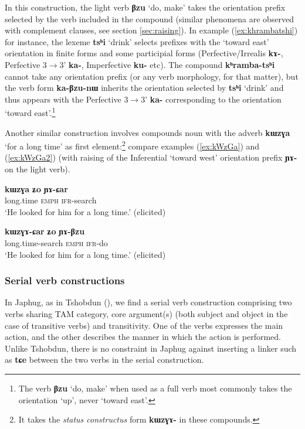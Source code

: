 \documentclass[oneside,a4paper,11pt]{article}
\newcommand{\ipa}[1]{\textbf{\phon#1}} %
\newcommand{\jpg}[2]{\ipa{#1} `#2'} %
\newcommand{\refb}[1]{(\ref{#1})}
\begin{document}
In this construction, the light verb \jpg{βzu}{do, make} takes the orientation prefix selected by the verb included in the compound (similar phenomena are observed with complement clauses, see section \ref{sec:raising}). In example \refb{ex:khrambatshi} for instance, the lexeme \jpg{tsʰi}{drink} selects prefixes with the `toward east' orientation in finite forms and some participial forms (Perfective/Irrealis \ipa{kɤ-}, Perfective 3$\rightarrow$3' \ipa{ka-}, Imperfective \ipa{ku-} etc). The compound  \ipa{kʰramba-tsʰi} cannot take any orientation prefix (or any verb morphology, for that matter), but the verb form \ipa{ka-βzu-nɯ} inherits the orientation selected by \jpg{tsʰi}{drink} and thus appears with the Perfective 3$\rightarrow$3' \ipa{ka-} corresponding to the orientation `toward east'.\footnote{The verb \jpg{βzu}{do, make} when used as a full verb most commonly takes the orientation `up', never `toward east'.}

Another similar construction involves compounds noun with the adverb \jpg{kɯzɣa}{for a long time} as first element:\footnote{It takes the \textit{status constructus} form \ipa{kɯzɣɤ-} in these compounds.} compare examples \refb{ex:kWzGa} and \refb{ex:kWzGa2} (with raising of the Inferential `toward west' orientation prefix \ipa{ɲɤ-} on the light verb).

\begin{exe}
\ex \label{ex:kWzGa}
\gll 
\ipa{kɯzɣa} 	\ipa{ʑo} 	\ipa{ɲɤ-ɕar} \\
long.time \textsc{emph} \textsc{ifr}-search \\
\glt `He looked for him for a long time.' (elicited)
\end{exe}

\begin{exe}
\ex \label{ex:kWzGa2}
\gll 
\ipa{kɯzɣɤ-ɕar} 	\ipa{ʑo} 	\ipa{ɲɤ-βzu} \\
long.time-search \textsc{emph} \textsc{ifr}-do \\
\glt `He looked for him for a long time.' (elicited)
\end{exe}

\subsubsection{Serial verb constructions} \label{sec:serial}
In Japhug, as in Tshobdun (\citealt[490-1]{sun12complementation}), we find a serial verb construction comprising two verbs sharing TAM category, core argument(s) (both subject and object in the case of transitive verbs) and transitivity. One of the verbs expresses the main action, and the other describes the manner in which the action is performed. Unlike Tshobdun, there is no constraint in Japhug against inserting a linker such as \ipa{tɕe} between the two verbs in the serial construction.
\end{document}
